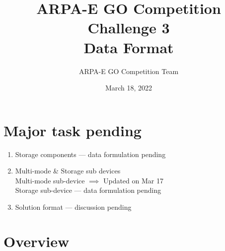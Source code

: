 \documentclass{article}
\title{ARPA-E GO Competition Challenge 3 \\ Data Format}
\author{ARPA-E GO Competition Team}
\date{March 18, 2022}
\begin{document}
\maketitle
{\color{red}
\section*{Major task pending}
\begin{enumerate}
    \item Storage components --- data formulation pending 
    \item Multi-mode \& Storage sub devices\\
        Multi-mode sub-device $\implies$ Updated on Mar 17 \\
        Storage sub-device --- data formulation pending \\
    \item Solution format --- discussion pending 
\end{enumerate}
}
\section{Overview}
\end{document}
